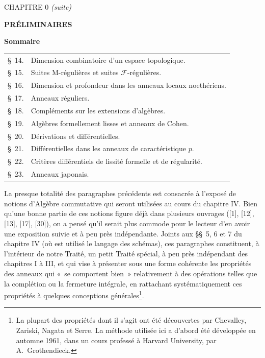 \clearpage
\thispagestyle{plain}
\label{chapter:0IV1-fr}

\begin{center}
{\large CHAPITRE 0 \textit{(suite)}\footnotemark\par}
\vspace{1.5em}
{\Large\bfseries PRÉLIMINAIRES\par}
\vspace{2em}
{\large\bfseries Sommaire\par}
\end{center}


\begin{center}
\begin{tabular}{@{}r l@{}}
\S~14. & Dimension combinatoire d'un espace topologique.\\
\S~15. & Suites M-régulières et suites $\mathscr F$-régulières.\\
\S~16. & Dimension et profondeur dans les anneaux locaux noethériens.\\
\S~17. & Anneaux réguliers.\\
\S~18. & Compléments sur les extensions d'algèbres.\\
\S~19. & Algèbres formellement lisses et anneaux de Cohen.\\
\S~20. & Dérivations et différentielles.\\
\S~21. & Différentielles dans les anneaux de caractéristique $p$.\\
\S~22. & Critères différentiels de lissité formelle et de régularité.\\
\S~23. & Anneaux japonais.
\end{tabular}
\end{center}

La presque totalité des paragraphes précédents est consacrée à l'exposé de
notions d'Algèbre commutative qui seront utilisées au cours du chapitre IV.
Bien qu'une bonne partie de ces notions figure déjà dans plusieurs ouvrages
([1], [12], [13], [17], [30]), on a pensé qu'il serait plus commode pour le
lecteur d'en avoir une exposition suivie et à peu près indépendante. Joints
aux \S\S~5, 6 et 7 du chapitre IV (où est utilisé le langage des schémas), ces
paragraphes constituent, à l'intérieur de notre Traité, un petit Traité
spécial, à peu près indépendant des chapitres I à III, et qui vise à présenter
sous une forme cohérente les propriétés des anneaux qui «~se comportent bien~»
relativement à des opérations telles que la complétion ou la fermeture
intégrale, en rattachant systématiquement ces propriétés à quelques
conceptions générales\footnote{La plupart des propriétés dont il s'agit ont
été découvertes par Chevalley, Zariski, Nagata et Serre. La méthode utilisée
ici a d'abord été développée en automne 1961, dans un cours professé à Harvard
University, par A.~Grothendieck.}.

